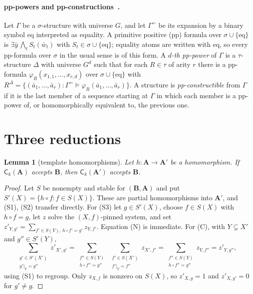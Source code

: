 \documentclass[11pt]{article}
\newtheorem{lemma}[theorem]{Lemma}
\theoremstyle{definition}
\theoremstyle{remark}
\newcommand{\Coh}{\mathsf{C}}
\newcommand{\eqrel}{\mathrm{eq}}
\begin{document}
\paragraph{pp-powers and pp-constructions~\cite{BOP18}.} Let $\Gamma$ be a
$\sigma$-structure with universe $G$, and let $\Gamma^{=}$ be its expansion by
a binary symbol $\eqrel$ interpreted as equality. A primitive positive (pp)
formula over $\sigma\cup\{\eqrel\}$ is $\exists\bar y\,\bigwedge_t S_t(\bar
w_t)$ with $S_t\in\sigma\cup\{\eqrel\}$; equality atoms are written with
$\eqrel$, so every pp-formula over $\sigma$ in the usual sense is of this
form. A \emph{$d$-th pp-power} of $\Gamma$ is a $\tau$-structure $\Delta$ with
universe $G^d$ such that for each $R\in\tau$ of arity $r$ there is a
pp-formula $\varphi_R(x_{1,1},\dots,x_{r,d})$ over $\sigma\cup\{\eqrel\}$ with
$R^\Delta=\{(\bar a_1,\dots,\bar a_r) : \Gamma^{=}\models
\varphi_R(\bar a_1,\dots,\bar a_r)\}$. A structure is
\emph{pp-constructible} from $\Gamma$ if it is the last member of a sequence
starting at $\Gamma$ in which each member is a pp-power of, or homomorphically
equivalent to, the previous one.

\section{Three reductions}

\begin{lemma}[template homomorphisms]\label{lem:hom}
Let $h\colon\mathbf A\to\mathbf A'$ be a homomorphism. If $\Coh_k(\mathbf A)$
accepts $\mathbf B$, then $\Coh_k(\mathbf A')$ accepts $\mathbf B$.
\end{lemma}
\begin{proof}
Let $S$ be nonempty and stable for $(\mathbf B,\mathbf A)$ and put
$S'(X)=\{h\circ f: f\in S(X)\}$. These are partial homomorphisms into
$\mathbf A'$, and (S1), (S2) transfer directly. For (S3) let $g\in S'(X)$,
choose $f\in S(X)$ with $h\circ f=g$, let $z$ solve the $(X,f)$-pinned system,
and set $z'_{Y,g'}=\sum_{f'\in S(Y),\,h\circ f'=g'} z_{Y,f'}$. Equation (N) is
immediate. For (C), with $Y\subsetneq X'$ and $g''\in S'(Y)$,
\[
\sum_{\substack{g'\in S'(X')\\ g'|_Y=g''}} z'_{X',g'}
=\sum_{\substack{f''\in S(Y)\\ h\circ f''=g''}}\ \sum_{\substack{f'\in S(X')\\ f'|_Y=f''}} z_{X',f'}
=\sum_{\substack{f''\in S(Y)\\ h\circ f''=g''}} z_{Y,f''}=z'_{Y,g''},
\]
using (S1) to regroup. Only $z_{X,f}$ is nonzero on $S(X)$, so
$z'_{X,g}=1$ and $z'_{X,g'}=0$ for $g'\neq g$.
\end{proof}
\end{document}
